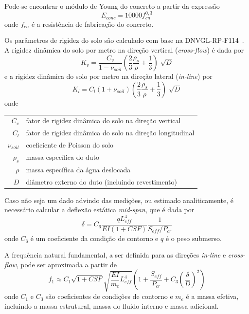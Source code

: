 Pode-se encontrar o módulo de Young do concreto a partir da expressão
\begin{equation}
\label{eq:viv-Econc}
E_\mathit{conc} = 10000 f_\mathit{cn}^{0,3}
\end{equation}
onde $f_\mathit{cn}$ é a resistência de fabricação do concreto.

Os parâmetros de rigidez do solo são calculado com base na DNVGL-RP-F114~\cite{DNVF114}.
A rigidez dinâmica do solo por metro na direção vertical (\textit{cross-flow}) é dada por
\begin{equation}
\label{eq:viv-Kv}
K_v = \frac{C_v}{1 - \nu_\mathit{soil}}\left(\frac{2}{3}\frac{\rho_s}{\rho}+\frac{1}{3}\right)\sqrt[]{D}
\end{equation}
e a rigidez dinâmica do solo por metro na direção lateral (\textit{in-line}) por
\begin{equation}
\label{eq:viv-Kl}
K_l = C_l (1+\nu_\mathit{soil})\left(\frac{2}{3}\frac{\rho_s}{\rho}+ \frac{1}{3}\right)\sqrt[]{D}
\end{equation}
onde

\begin{tabular}{rl}
	$C_v$               & fator de rigidez dinâmica do solo na direção vertical\\
	$C_l$               & fator de rigidez dinâmica do solo na direção longitudinal\\
	$\nu_\mathit{soil}$ & coeficiente de Poisson do solo\\
	$\rho_s$            & massa específica do duto\\
	$\rho$              & massa específica da água deslocada\\
	$D$                 & diâmetro externo do duto (incluindo revestimento)
\end{tabular}

Caso não seja um dado advindo das medições, ou estimado analiticamente, é necessário calcular a deflexão estática \textit{mid-span}, que é dada por
\begin{equation}
\label{eq:viv-deflex}
\delta = C_6 \frac{q L_\mathit{eff}^4}{\mathit{EI} (1 + \mathit{CSF})} \frac{1}{S_\mathit{eff}/P_\mathit{cr}}
\end{equation}
onde $C_6$ é um coeficiente da condição de contorno e $q$ é o peso submerso.

A frequência natural fundamental, a ser definida para as direções \textit{in-line} e \textit{cross-flow}, pode ser aproximada a partir de
\begin{equation}
\label{eq:viv-f1}
f_1 \approx C_1 \sqrt{1 + \mathit{CSF}}\sqrt{\frac{\mathit{EI}}{m_e} L_\mathit{eff}^4} \left(1 + \frac{S_\mathit{eff}}{P_\mathit{cr}} + C_3 \left(\frac{\delta}{D}\right)^2\right)
\end{equation}
onde $C_1$ e $C_3$ são coeficientes de condições de contorno e $m_e$ é a massa efetiva, incluindo a massa estrutural, massa do fluido interno e massa adicional.

